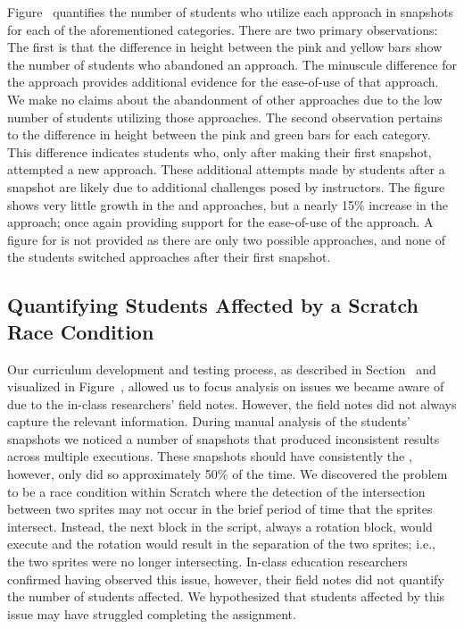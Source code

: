 Figure~ quantifies the number of students who
utilize each approach in \stwo{} snapshots for each of the aforementioned
categories. There are two primary observations: The first is that the
difference in height between the pink and yellow bars show the number of
students who abandoned an approach. The minuscule difference for the \glideto{}
approach provides additional evidence for the ease-of-use of that approach. We
make no claims about the abandonment of other approaches due to the low number
of students utilizing those approaches. The second observation pertains to the
difference in height between the pink and green bars for each category. This
difference indicates students who, only after making their first \com{}
snapshot, attempted a new approach. These additional attempts made by students
after a \com{} snapshot are likely due to additional challenges posed by
instructors. The figure shows very little growth in the \abs{} and \rel{}
approaches, but a nearly 15\% increase in the \glideto{} approach; once again
providing support for the ease-of-use of the \glideto{} approach. A figure for
\sone{} is not provided as there are only two possible approaches, and none of
the students switched approaches after their first \com{} snapshot.

\subsection{Quantifying Students Affected by a Scratch Race Condition}

Our curriculum development and testing process, as described in
Section~ and visualized in
Figure~, allowed us to focus analysis on issues we became
aware of due to the in-class researchers' field notes. However, the field notes
did not always capture the relevant information. During manual analysis of the
students' snapshots we noticed a number of snapshots that produced inconsistent
results across multiple executions. These snapshots should have consistently
\caught{} the \zebra{}, however, only did so approximately 50\% of the time. We
discovered the problem to be a race condition within Scratch where the
detection of the intersection between two sprites may not occur in the brief
period of time that the sprites intersect. Instead, the next block in the
script, always a rotation block, would execute and the rotation would result in
the separation of the two sprites; i.e., the two sprites were no longer
intersecting. In-class education researchers confirmed having observed this
issue, however, their field notes did not quantify the number of students
affected. We hypothesized that students affected by this issue may have
struggled completing the assignment.


